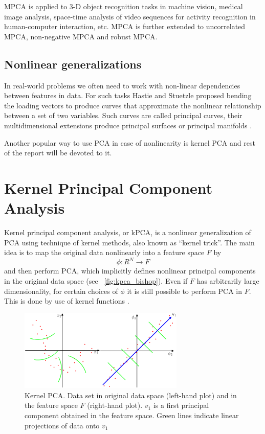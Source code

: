 MPCA is applied to 3-D object recognition tasks in machine vision, medical image analysis, space-time analysis of video sequences for activity recognition in human-computer interaction, etc.  MPCA is further extended to uncorrelated MPCA, non-negative MPCA and robust MPCA.

\subsection{Nonlinear generalizations}
In real-world problems we often need to work with non-linear dependencies between features in data. For such tasks Hastie and Stuetzle \citep{hastie} proposed bending the loading
vectors to produce curves that approximate the nonlinear relationship between
a set of two variables. Such curves are called principal curves, their multidimensional extensions produce principal surfaces or principal manifolds \citep{gorban}.

Another popular way to use PCA in case of nonlinearity is kernel PCA and rest of the report will be devoted to it.

\section{Kernel Principal Component Analysis}
Kernel principal component analysis, or kPCA, is a nonlinear generalization of PCA using technique of kernel methods, also known as ``kernel trick''. The main idea is to map the original data nonlinearly into a feature space $F$ by 
\begin{equation}
\phi: R^N \rightarrow F 
\end{equation}
and then perform PCA, which implicitly defines nonlinear
principal components in the original data space (see ~\autoref{fig:kpca_bishop}). Even if $F$ has arbitrarily large dimensionality, for certain choices of $\phi$ it is still possible to perform PCA in $F$. This is done by use of kernel functions \citep*{original_paper}.

\begin{figure}[ht]
	\centering
	\includegraphics[width=0.7\textwidth]{img/kpca_example_from_bishop.png}
	\caption{\label{fig:kpca_bishop}Kernel PCA. Data set in original data space (left-hand plot) and in the feature space $F$ (right-hand plot). \boldmath$v_1$ is a first principal component obtained in the feature space. Green lines indicate linear projections of data onto \boldmath$v_1$ \citep{bishop}}
\end{figure}


